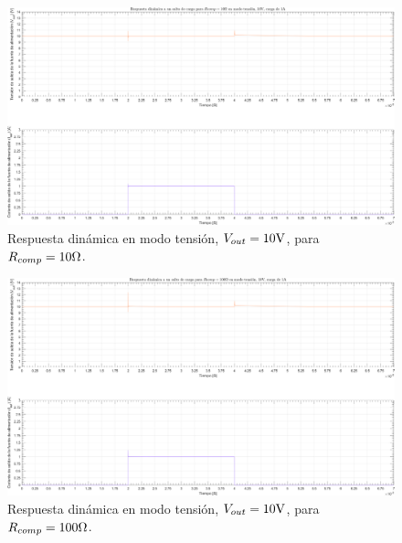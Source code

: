\clearpage

\begin{figure}[H] %
\begin{center}
\includegraphics[width=1.1 \textwidth, angle=90]{./img/plots/dynamic/power_supply_RCOMP_10_STEP_Modo1.png}
\caption{\label{fig:fig_power_supply_RCOMP_STEP_10_Modo1}\footnotesize{Respuesta dinámica en modo tensión, $V_{out} = 10 \si[per-mode=symbol]{\volt}$, para $R_{comp} = 10 \si[per-mode=symbol]{\ohm} $.}}
\end{center}
\end{figure}

\clearpage

\begin{figure}[H] %
\begin{center}
\includegraphics[width=1.1 \textwidth, angle=90]{./img/plots/dynamic/power_supply_RCOMP_100_STEP_Modo1.png}
\caption{\label{fig:fig_power_supply_RCOMP_STEP_100_Modo1}\footnotesize{Respuesta dinámica en modo tensión, $V_{out} = 10 \si[per-mode=symbol]{\volt}$, para $R_{comp} = 100 \si[per-mode=symbol]{\ohm} $.}}
\end{center}
\end{figure}

